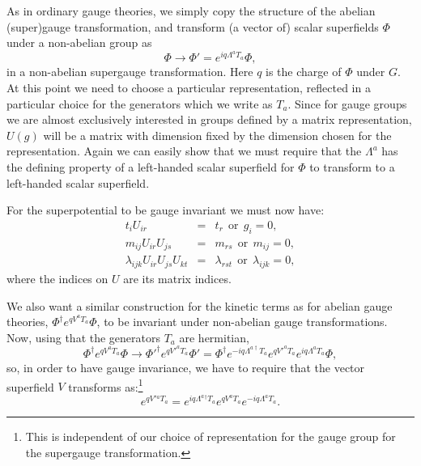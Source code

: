 \documentclass[notes.tex]{subfiles}
\begin{document}
As in ordinary gauge theories, we simply copy the structure of the abelian (super)gauge transformation, and transform (a vector of) scalar superfields $\Phi$ under a non-abelian group as
\[\Phi \to \Phi'=e^{iq \Lambda^aT_a}\Phi,\]
in a non-abelian supergauge transformation. Here $q$ is the charge of $\Phi$ under $G$. At this point we need to choose a particular representation, reflected in a particular choice for the generators which we write as $T_a$. Since for gauge groups we are almost exclusively interested in groups defined by a matrix representation, $U(g)$ will be a matrix with dimension fixed by the dimension chosen for the representation. Again we can easily show that we must require that the $\Lambda^a$ has the defining property of a left-handed scalar superfield for $\Phi$ to transform to a left-handed scalar superfield.

For the superpotential to be gauge invariant we must now have:
\begin{eqnarray}
t_iU_{ir} &=& t_r ~~\text{or}~~ g_i = 0, \\
m_{ij}U_{ir} U_{js} &=& m_{rs} ~~\text{or}~~m_{ij}=0, \\
 \lambda_{ijk}U_{ir} U_{js}U_{kt}&=& \lambda_{rst} ~~\text{or}~~\lambda_{ijk}=0,
\end{eqnarray}
where the indices on $U$ are its matrix indices. 

We also want a similar construction for the kinetic terms as for abelian gauge theories, $\Phi^\dagger e^{qV^aT_a}\Phi$, to be invariant under non-abelian gauge transformations. Now, using that the generators $T_a$ are hermitian, 
\[\Phi^\dagger e^{qV^aT_a}\Phi \to \Phi'^\dagger e^{qV'^aT_a}\Phi' = \Phi^\dagger e^{-iq\Lambda^{a\dagger} T_a} e^{qV'^aT_a}e^{iq\Lambda^aT_a}\Phi,\]
so, in order to have gauge invariance, we have to require that the vector superfield $V$ transforms as:\footnote{This is independent of our choice of representation for the gauge group for the supergauge transformation.}
\begin{equation}
e^{qV'{}^aT_a} = e^{iq\Lambda^a{}^\dagger T_a}e^{qV^aT_a} e^{-iq\Lambda^a T_a}.
\end{equation}
\end{document}
